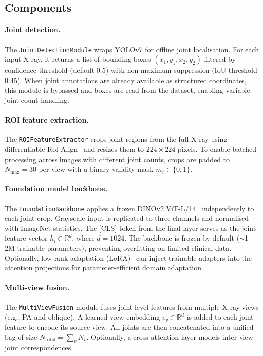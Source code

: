 \documentclass{article}
\begin{document}
\subsection{Components}

\paragraph{Joint detection.} The \texttt{JointDetectionModule} wraps YOLOv7 for offline joint localisation. For each input X-ray, it returns a list of bounding boxes $(x_1,y_1,x_2,y_2)$ filtered by confidence threshold (default 0.5) with non-maximum suppression (IoU threshold 0.45). When joint annotations are already available as structured coordinates, this module is bypassed and boxes are read from the dataset, enabling variable-joint-count handling.

\paragraph{ROI feature extraction.} The \texttt{ROIFeatureExtractor} crops joint regions from the full X-ray using differentiable RoI-Align~\cite{tvroi} and resizes them to $224\times224$ pixels. To enable batched processing across images with different joint counts, crops are padded to $N_{\max}=30$ per view with a binary validity mask $m_i \in \{0,1\}$.

\paragraph{Foundation model backbone.} The \texttt{FoundationBackbone} applies a frozen DINOv2 ViT-L/14~\cite{dinov22023} independently to each joint crop. Grayscale input is replicated to three channels and normalised with ImageNet statistics. The [CLS] token from the final layer serves as the joint feature vector $h_i \in \mathbb{R}^{d}$, where $d=1024$. The backbone is frozen by default ($\sim$1--2M trainable parameters), preventing overfitting on limited clinical data. Optionally, low-rank adaptation (LoRA)~\cite{lora2021} can inject trainable adapters into the attention projections for parameter-efficient domain adaptation.

\paragraph{Multi-view fusion.} The \texttt{MultiViewFusion} module fuses joint-level features from multiple X-ray views (e.g., PA and oblique). A learned view embedding $e_v \in \mathbb{R}^d$ is added to each joint feature to encode its source view. All joints are then concatenated into a unified bag of size $N_{\text{total}} = \sum_v N_v$. Optionally, a cross-attention layer models inter-view joint correspondences.
\end{document}
